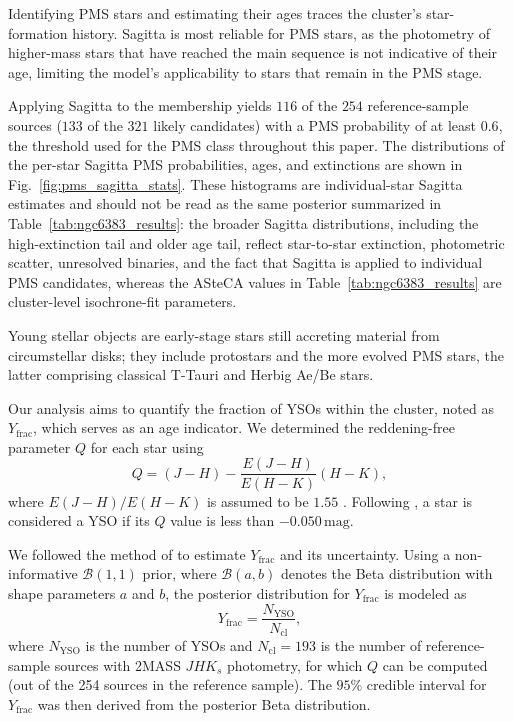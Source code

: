 \documentclass{aa}
\begin{document}
Identifying PMS stars and estimating their ages traces the cluster's star-formation history. Sagitta is most reliable for PMS stars, as the photometry of higher-mass stars that have reached the main sequence is not indicative of their age, limiting the model's applicability to stars that remain in the PMS stage.

Applying Sagitta to the membership yields $116$ of the $254$ reference-sample sources ($133$ of the $321$ likely candidates) with a PMS probability of at least $0.6$, the threshold used for the PMS class throughout this paper. The distributions of the per-star Sagitta PMS probabilities, ages, and extinctions are shown in Fig.~\ref{fig:pms_sagitta_stats}. These histograms are individual-star Sagitta estimates and should not be read as the same posterior summarized in Table~\ref{tab:ngc6383_results}: the broader Sagitta distributions, including the high-extinction tail and older age tail, reflect star-to-star extinction, photometric scatter, unresolved binaries, and the fact that Sagitta is applied to individual PMS candidates, whereas the ASteCA values in Table~\ref{tab:ngc6383_results} are cluster-level isochrone-fit parameters.


Young stellar objects are early-stage stars still accreting material from circumstellar disks; they include protostars and the more evolved PMS stars, the latter comprising classical T-Tauri and Herbig Ae/Be stars.

Our analysis aims to quantify the fraction of YSOs within the cluster, noted as $ Y_{\text{frac}} $, which serves as an age indicator. We determined the reddening-free parameter $ Q $ for each star using
\begin{equation}
	Q = (J - H) - \frac{E(J-H)}{E(H - K)} (H-K),
\end{equation}
where $ E(J-H)/E(H-K) $ is assumed to be $1.55$ \citep{1990ARA&A..28...37M}. Following \citet{2013MNRAS.436.1465B}, a star is considered a YSO if its $ Q $ value is less than $-0.050\,\mathrm{mag}$.

We followed the method of \citet{2011PASA...28..128C} to estimate $ Y_{\text{frac}} $ and its uncertainty. Using a non-informative $\mathcal{B}(1, 1)$ prior, where $\mathcal{B}(a,b)$ denotes the Beta distribution with shape parameters $a$ and $b$, the posterior distribution for $ Y_{\text{frac}} $ is modeled as
\begin{equation}
	Y_{\text{frac}} = \frac{N_{\text{YSO}}}{N_{\text{cl}}},
\end{equation}
where $ N_{\text{YSO}} $ is the number of YSOs and $ N_{\text{cl}}=193 $ is the number of reference-sample sources with 2MASS $JHK_s$ photometry, for which $Q$ can be computed (out of the 254 sources in the reference sample). The $95\%$ credible interval for $ Y_{\text{frac}} $ was then derived from the posterior Beta distribution.
\end{document}
